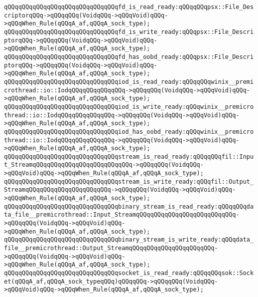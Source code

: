 \newline
\verb|qQQqqQQqqQQqqQQqqQQqqQQqqQQqqQQqfd_is_read_ready:qQQqqQQqpsx::File_DescriptorqQQq->qQQqqQQq(VoidqQQq->qQQqVoid)qQQq->qQQqWhen_Rule(qQQqA_af,qQQqA_sock_type);|\newline
\verb|qQQqqQQqqQQqqQQqqQQqqQQqqQQqqQQqfd_is_write_ready:qQQqpsx::File_DescriptorqQQq->qQQqqQQq(VoidqQQq->qQQqVoid)qQQq->qQQqWhen_Rule(qQQqA_af,qQQqA_sock_type);|\newline
\verb|qQQqqQQqqQQqqQQqqQQqqQQqqQQqqQQqfd_has_oobd_ready:qQQqpsx::File_DescriptorqQQq->qQQqqQQq(VoidqQQq->qQQqVoid)qQQq->qQQqWhen_Rule(qQQqA_af,qQQqA_sock_type);|\newline
\newline
\verb|qQQqqQQqqQQqqQQqqQQqqQQqqQQqqQQqiod_is_read_ready:qQQqqQQqwinix__premicrothread::io::IodqQQqqQQqqQQqqQQq->qQQqqQQq(VoidqQQq->qQQqVoid)qQQq->qQQqWhen_Rule(qQQqA_af,qQQqA_sock_type);|\newline
\verb|qQQqqQQqqQQqqQQqqQQqqQQqqQQqqQQqiod_is_write_ready:qQQqwinix__premicrothread::io::IodqQQqqQQqqQQqqQQq->qQQqqQQq(VoidqQQq->qQQqVoid)qQQq->qQQqWhen_Rule(qQQqA_af,qQQqA_sock_type);|\newline
\verb|qQQqqQQqqQQqqQQqqQQqqQQqqQQqqQQqiod_has_oobd_ready:qQQqwinix__premicrothread::io::IodqQQqqQQqqQQqqQQq->qQQqqQQq(VoidqQQq->qQQqVoid)qQQq->qQQqWhen_Rule(qQQqA_af,qQQqA_sock_type);|\newline
\newline
\verb|qQQqqQQqqQQqqQQqqQQqqQQqqQQqqQQqstream_is_read_ready:qQQqqQQqfil::Input_StreamqQQqqQQqqQQqqQQqqQQqqQQqqQQq->qQQqqQQq(VoidqQQq->qQQqVoid)qQQq->qQQqWhen_Rule(qQQqA_af,qQQqA_sock_type);|\newline
\verb|qQQqqQQqqQQqqQQqqQQqqQQqqQQqqQQqstream_is_write_ready:qQQqfil::Output_StreamqQQqqQQqqQQqqQQqqQQqqQQq->qQQqqQQq(VoidqQQq->qQQqVoid)qQQq->qQQqWhen_Rule(qQQqA_af,qQQqA_sock_type);|\newline
\newline
\verb|qQQqqQQqqQQqqQQqqQQqqQQqqQQqqQQqbinary_stream_is_read_ready:qQQqqQQqdata_file__premicrothread::Input_StreamqQQqqQQqqQQqqQQqqQQqqQQqqQQq->qQQqqQQq(VoidqQQq->qQQqVoid)qQQq->qQQqWhen_Rule(qQQqA_af,qQQqA_sock_type);|\newline
\verb|qQQqqQQqqQQqqQQqqQQqqQQqqQQqqQQqbinary_stream_is_write_ready:qQQqdata_file__premicrothread::Output_StreamqQQqqQQqqQQqqQQqqQQqqQQq->qQQqqQQq(VoidqQQq->qQQqVoid)qQQq->qQQqWhen_Rule(qQQqA_af,qQQqA_sock_type);|\newline
\newline
\verb|qQQqqQQqqQQqqQQqqQQqqQQqqQQqqQQqsocket_is_read_ready:qQQqqQQqsok::Socket(qQQqA_af,qQQqA_sock_typeqQQq)qQQqqQQq->qQQqqQQq(VoidqQQq->qQQqVoid)qQQq->qQQqWhen_Rule(qQQqA_af,qQQqA_sock_type);|\newline
